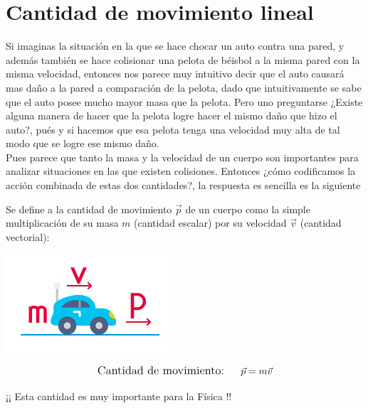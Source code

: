 \chapter{Cantidad de movimiento lineal}

\vspace{1.50cm}

\noindent Si imaginas la situación  en la que se hace chocar un auto contra una pared, y además también se hace colisionar una pelota de béisbol a la misma pared con la misma velocidad, entonces nos parece muy intuitivo decir que el auto causará mas daño a la pared a comparación de la pelota, dado que intuitivamente se sabe que el auto posee mucho mayor masa que la pelota. Pero uno preguntarse ¿Existe alguna manera de hacer que la pelota logre hacer el mismo daño que hizo el auto?, pués y si hacemos que esa pelota tenga una velocidad muy alta de tal modo que se logre ese mismo daño.\\

\noindent Pues parece que tanto la masa y la velocidad de un cuerpo son importantes para analizar situaciones en las que existen colisiones. Entonces ¿cómo codificamos la acción combinada de estas dos cantidades?, la respuesta es sencilla es la siguiente\\

\begin{tcolorbox}
Se define a la cantidad de movimiento $\vec{p}$ de un cuerpo como la simple multiplicación de su masa $m$ (cantidad escalar) por su velocidad $\vec{v}$ (cantidad vectorial):
\begin{center}
\includegraphics[scale=0.5]{images/figura1.png} 
\end{center}

\centering
\begin{center}
\begin{equation*}
\large{
\text{Cantidad de movimiento: }\quad \vec{p} = m\vec{v}
}
\end{equation*}
\end{center}

\large{¡¡  Esta cantidad es muy importante para la Física !!}
\end{tcolorbox} 
\vspace{0.5cm}

